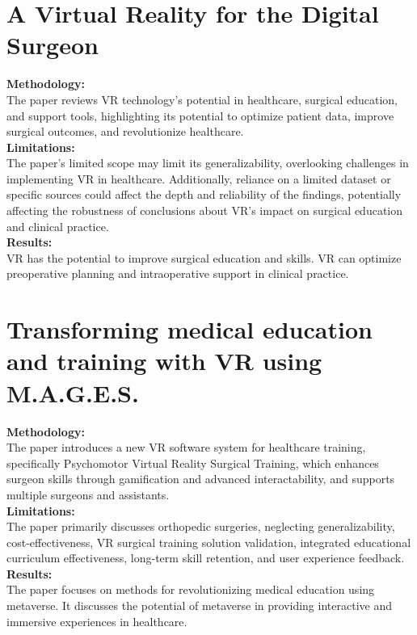 \section{A Virtual Reality for the Digital Surgeon\cite{velazquez2021virtual}}
\textbf{Methodology:}\\The paper reviews VR technology's potential in healthcare, surgical education, and support tools, highlighting its potential to optimize patient data, improve surgical outcomes, and revolutionize healthcare.\\
\textbf{Limitations:}\\The paper's limited scope may limit its generalizability, overlooking challenges in implementing VR in healthcare. Additionally, reliance on a limited dataset or specific sources could affect the depth and reliability of the findings, potentially affecting the robustness of conclusions about VR's impact on surgical education and clinical practice.\\
\textbf{Results:}\\ VR has the potential to improve surgical education and skills.
VR can optimize preoperative planning and intraoperative support in clinical practice.
\section{Transforming medical education and training with VR using M.A.G.E.S.\cite{ProceedingsArticle}}
\textbf{Methodology:}\\The paper introduces a new VR software system for healthcare training, specifically Psychomotor Virtual Reality Surgical Training, which enhances surgeon skills through gamification and advanced interactability, and supports multiple surgeons and assistants.\\
\textbf{Limitations:}\\The paper primarily discusses orthopedic surgeries, neglecting generalizability, cost-effectiveness, VR surgical training solution validation, integrated educational curriculum effectiveness, long-term skill retention, and user experience feedback.\\
\textbf{Results:}\\The paper focuses on methods for revolutionizing medical education using metaverse. It discusses the potential of metaverse in providing interactive and immersive experiences in healthcare.
